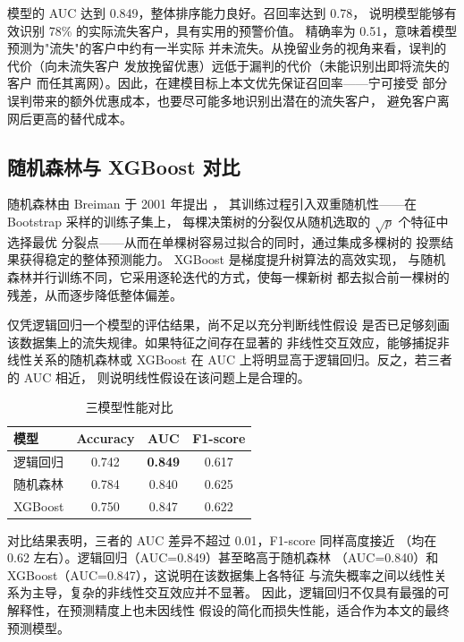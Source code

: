 模型的 AUC 达到 0.849，整体排序能力良好。召回率达到 0.78，
说明模型能够有效识别 78\% 的实际流失客户，具有实用的预警价值。
精确率为 0.51，意味着模型预测为"流失"的客户中约有一半实际
并未流失。从挽留业务的视角来看，误判的代价（向未流失客户
发放挽留优惠）远低于漏判的代价（未能识别出即将流失的客户
而任其离网）。因此，在建模目标上本文优先保证召回率——宁可接受
部分误判带来的额外优惠成本，也要尽可能多地识别出潜在的流失客户，
避免客户离网后更高的替代成本。

\subsection{随机森林与 XGBoost 对比}

随机森林由 Breiman 于 2001 年提出 \cite{breiman2001random}，
其训练过程引入双重随机性——在 Bootstrap 采样的训练子集上，
每棵决策树的分裂仅从随机选取的 $\sqrt{p}$ 个特征中选择最优
分裂点——从而在单棵树容易过拟合的同时，通过集成多棵树的
投票结果获得稳定的整体预测能力。
XGBoost \cite{chen2016xgboost} 是梯度提升树算法的高效实现，
与随机森林并行训练不同，它采用逐轮迭代的方式，使每一棵新树
都去拟合前一棵树的残差，从而逐步降低整体偏差。

仅凭逻辑回归一个模型的评估结果，尚不足以充分判断线性假设
是否已足够刻画该数据集上的流失规律。如果特征之间存在显著的
非线性交互效应，能够捕捉非线性关系的随机森林或 XGBoost
在 AUC 上将明显高于逻辑回归。反之，若三者的 AUC 相近，
则说明线性假设在该问题上是合理的。

\begin{table}[H]
    \centering
    \caption{三模型性能对比}
    \label{tab:model_compare}
    \begin{tabular}{lccc}
        \toprule
        模型 & Accuracy & AUC & F1-score \\
        \midrule
        逻辑回归 & 0.742 & \textbf{0.849} & 0.617 \\
        随机森林 & 0.784 & 0.840 & 0.625 \\
        XGBoost  & 0.750 & 0.847 & 0.622 \\
        \bottomrule
    \end{tabular}
\end{table}

对比结果表明，三者的 AUC 差异不超过 0.01，F1-score 同样高度接近
（均在 0.62 左右）。逻辑回归（AUC=0.849）甚至略高于随机森林
（AUC=0.840）和 XGBoost（AUC=0.847），这说明在该数据集上各特征
与流失概率之间以线性关系为主导，复杂的非线性交互效应并不显著。
因此，逻辑回归不仅具有最强的可解释性，在预测精度上也未因线性
假设的简化而损失性能，适合作为本文的最终预测模型。

